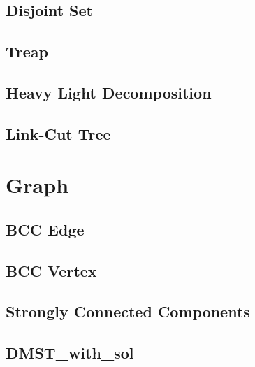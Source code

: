 \documentclass[10pt,twocolumn,oneside]{article}
\begin{document}
\subsection{Disjoint Set}


\subsection{Treap}


\subsection {Heavy Light Decomposition}


\subsection {Link-Cut Tree}


\section{Graph}

\subsection{BCC Edge}


\subsection{BCC Vertex}


\subsection{Strongly Connected Components}


%

\subsection{DMST\_with\_sol}

\end{document}
